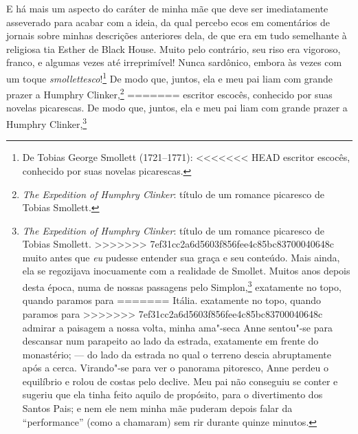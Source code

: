 {{{{{{{{{{{{{{{{{{{{{{{{{{{{{{{{{{{{{{{{{{%
E há mais um aspecto do caráter de minha mãe que deve ser
imediatamente asseverado para acabar com a ideia, da qual percebo ecos
em comentários de jornais sobre minhas descrições anteriores dela, de
que era em tudo semelhante à religiosa tia Esther de Black House. Muito
pelo contrário, seu riso era vigoroso, franco, e algumas vezes até
irreprimível! Nunca sardônico, embora às vezes com um toque
\textit{smollettesco}!\footnote{De Tobias George Smollett (1721--1771):
<<<<<<< HEAD
  escritor escocês, conhecido por suas novelas picarescas.} De modo que, juntos, ela e meu pai liam com grande prazer a
Humphry Clinker,\footnote{\textit{The Expedition of Humphry Clinker}:
  título de um romance picaresco de Tobias Smollett.}
=======
  escritor escocês, conhecido por suas novelas picarescas.  De modo que, juntos, ela e meu pai liam com grande prazer a
Humphry Clinker,\footnote{\textit{The Expedition of Humphry Clinker}:
  título de um romance picaresco de Tobias Smollett. 
>>>>>>> 7ef31cc2a6d5603f856fee4c85bc83700040648c
muito antes que \textit{eu} pudesse entender sua graça e seu conteúdo.
Mais ainda, ela se regozijava inocuamente com a realidade de Smollet.
Muitos anos depois desta época, numa de nossas passagens pelo
Simplon,\footnote{\textit{Simplon Pass}: passo alpino entre a Suíça e a
<<<<<<< HEAD
  Itália.} exatamente no topo, quando paramos para
=======
  Itália.  exatamente no topo, quando paramos para
>>>>>>> 7ef31cc2a6d5603f856fee4c85bc83700040648c
admirar a paisagem a nossa volta, minha ama"-seca Anne sentou"-se para
descansar num parapeito ao lado da estrada, exatamente em frente do
monastério; --- do lado da estrada no qual o terreno descia abruptamente
após a cerca. Virando"-se para ver o panorama pitoresco, Anne perdeu o
equilíbrio e rolou de costas pelo declive. Meu pai não conseguiu se
conter e sugeriu que ela tinha feito aquilo de propósito, para o
divertimento dos Santos Pais; e nem ele nem minha mãe puderam depois
falar da ``performance'' (como a chamaram) sem rir durante quinze
minutos.

}}}}}}}}}}}}}}}}}}}}}}}}}}}}}}}}}}}}}}}}}}}
